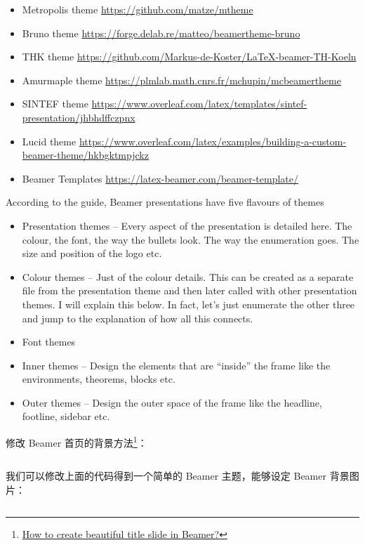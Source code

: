 \begin{column}{0.5\textwidth}
\begin{itemize}
  \item Metropolis theme \url{https://github.com/matze/mtheme}
  \item Bruno theme \url{https://forge.delab.re/matteo/beamertheme-bruno}
  \item THK theme \url{https://github.com/Markus-de-Koster/LaTeX-beamer-TH-Koeln}
  \item Amurmaple theme \url{https://plmlab.math.cnrs.fr/mchupin/mcbeamertheme}
  \item SINTEF theme \url{https://www.overleaf.com/latex/templates/sintef-presentation/jhbhdffczpnx}
  \item Lucid theme \url{https://www.overleaf.com/latex/examples/building-a-custom-beamer-theme/hkbgktmpjckz}
  \item Beamer Templates \url{https://latex-beamer.com/beamer-template/}
\end{itemize}

According to the guide, Beamer presentations have five flavours of themes

\begin{itemize}
  \item Presentation themes – Every aspect of the presentation is detailed here. The colour, the font, the way the bullets look. The way the enumeration goes. The size and position of the logo etc.
  \item Colour themes – Just of the colour details. This can be created as a separate file from the presentation theme and then later called with other presentation themes. I will explain this below. In fact, let’s just enumerate the other three and jump to the explanation of how all this connects.
  \item Font themes
  \item Inner themes – Design the elements that are “inside” the frame like the environments, theorems, blocks etc.
  \item Outer themes – Design the outer space of the frame like the headline, footline, sidebar etc. 
\end{itemize}

修改 Beamer 首页的背景方法\footnote{\href{https://latex-beamer.com/tutorials/beautiful-title/}{How to create beautiful title slide in Beamer?}}：

\inputminted[linenos=true]{latex}{examples/beamer/themes/background/beautiful-title.tex}

我们可以修改上面的代码得到一个简单的 Beamer 主题，能够设定 Beamer 背景图片：


\end{column}
